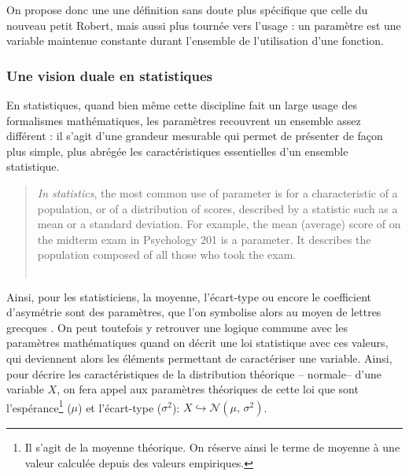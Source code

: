 \documentclass[12pt, a4paper, oneside]{book}
\begin{document}

	On propose donc une une définition sans doute plus spécifique que celle du nouveau petit Robert, mais aussi plus tournée vers l'usage : un paramètre est une variable maintenue constante durant l'ensemble de l'utilisation d'une fonction.
	
	\subsubsection{Une vision duale en statistiques}
	En statistiques, quand bien même cette discipline fait un large usage des formalismes mathématiques, les paramètres recouvrent un ensemble assez différent : il s'agit d'une \og grandeur mesurable qui permet de présenter de façon plus simple, plus abrégée les caractéristiques essentielles d'un ensemble statistique.\fg{} \autocite[Paramètre, \textsc{stat.} (calcul des probabilités)]{tresor1992}
	\begin{quote}
		\textit{In statistics}, the most common use of \og parameter\fg{} is for a characteristic of a population, or of a distribution of scores, described by a statistic such as a mean or a standard deviation. For example, the mean (average) score of on the midterm exam in Psychology 201 is a parameter. It describes the population composed of all those who took the exam.\\
		\mbox{}~ \hfill \autocite[164]{vogt1993dictionary}
	\end{quote}
	Ainsi, pour les statisticiens, la moyenne, l'écart-type ou encore le coefficient d'asymétrie sont des paramètres, que l'on symbolise alors au moyen de lettres grecques \autocite[ibid.]{vogt1993dictionary}.
	On peut toutefois y retrouver une logique commune avec les paramètres mathématiques quand on décrit une loi statistique avec ces valeurs, qui deviennent alors les éléments permettant de caractériser une variable. Ainsi, pour décrire les caractéristiques de la distribution théorique -- normale-- d'une variable $X$, on fera appel aux paramètres théoriques de cette loi que sont l'espérance\footnote{Il s'agit de la moyenne théorique. On réserve ainsi le terme de moyenne à une valeur calculée depuis des valeurs empiriques.} ($\mu$) et l'écart-type ($\sigma^{2}$): $X \hookrightarrow  \mathcal{N}(\mu,\,\sigma^{2})$.
	
\end{document}
